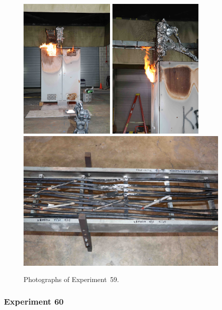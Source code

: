 \begin{figure}[p]
\centering
\includegraphics[height=2.75in,angle=-90]{../FIGURES/Test_59_25_min_55_s}
\includegraphics[height=2.75in,angle=-90]{../FIGURES/Test_59_side} \\
\includegraphics[height=2.75in]{../FIGURES/Test_59_scar}
\caption[Photographs of Experiment~59]{Photographs of Experiment~59.}
\label{fig:Test_59_photos}
\end{figure}


\clearpage

\subsubsection{Experiment 60}


